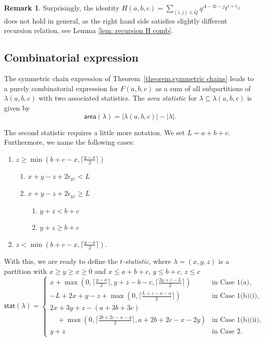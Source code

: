 \documentclass[11pt,reqno]{amsart}
\newcommand{\defn}[1]{{\color{darkred}\emph{#1}}} %
\newcommand{\area}{\mathsf{area}}
\newcommand{\stat}{\mathsf{stat}}
\theoremstyle{definition}
\newtheorem{remark}[theorem]{Remark}
\numberwithin{equation}{section}
\begin{document}
\begin{remark}
Surprisingly, the identity $H(a,b,c) = \sum_{(i,j) \in \widetilde{Q}} q^{A-2i-j} t^{i+\epsilon_{ij}}$ does not hold in general,
as the right hand side satisfies slightly different recursion relation, see Lemma \ref{lem: recursion H comb}.
\end{remark}

\subsection{Combinatorial expression}
\label{section.combinatorics}

The symmetric chain expression of Theorem~\ref{theorem.symmetric chains} leads to a purely combinatorial
expression for $F(a,b,c)$ as a sum of all subpartitions of $\lambda(a,b,c)$ with two associated statistics.
The \defn{area statistic} for $\lambda \subseteq \lambda(a,b,c)$ is given by 
\[
	\area(\lambda) = |\lambda(a,b,c)| - |\lambda|.
\]

The second statistic requires a little more notation. We set $L=a+b+c$.
Furthermore, we name the following cases:
\begin{enumerate}
\item[\textbf{Case 1.}] $z \geqslant \min(b+c-x, \lceil \frac{y-a}{2} \rceil)$
\begin{enumerate}
\item[\textbf{(a)}] $x+y-z+2 \epsilon_{yz}<L$
\item[\textbf{(b)}] $x+y-z+2 \epsilon_{yz}\geqslant L$
\begin{enumerate}
\item[\textbf{(i)}] $y+z<b+c$
\item[\textbf{(ii)}] $y+z\geqslant b+c$
\end{enumerate}
\end{enumerate}
\item[\textbf{Case 2.}] $z < \min(b+c-x, \lceil \frac{y-a}{2} \rceil)$.
\end{enumerate}
With this, we are ready to define the \defn{$t$-statistic}, where $\lambda=(x,y,z)$ is a partition
with $x\geqslant y \geqslant x \geqslant 0$ and $x\leqslant a+b+c$, $y \leqslant b+c$, $z\leqslant c$
\begin{equation}
\label{equation.statistics}
\stat(\lambda) = \begin{cases}
	x+\max(0,\lceil \frac{y-a}{2} \rceil, y+z-b-c,\lceil \frac{2y+z-L}{2} \rceil) & \text{in Case 1(a),}\\
	-L+2x+y-z+\max(0,\lceil \frac{L+z-x-a}{2} \rceil) & \text{in Case 1(b)(i),}\\
	2x+3y+z-(a+3b+3c) &\\
	\quad+\max(0,\lceil \frac{2b+2c-x-y}{2}\rceil, a+2b+2c-x-2y) & \text{in Case 1(b)(ii),}\\
	y+z & \text{in Case 2.}
	\end{cases}
\end{equation}
\end{document}

